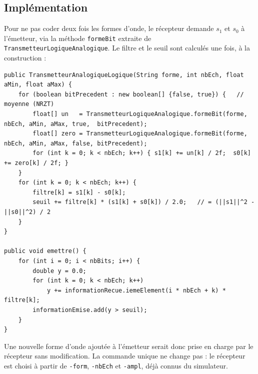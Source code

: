 \documentclass[11pt,a4paper]{article}
\newcommand{\cls}[1]{\texttt{#1}}
\begin{document}
\subsection{Implémentation}
Pour ne pas coder deux fois les formes d'onde, le récepteur demande $s_1$ et $s_0$ à l'émetteur, via la méthode \texttt{formeBit} extraite de \cls{TransmetteurLogiqueAnalogique}. Le filtre et le seuil sont calculés une fois, à la construction :
\begin{lstlisting}
public TransmetteurAnalogiqueLogique(String forme, int nbEch, float aMin, float aMax) {
    for (boolean bitPrecedent : new boolean[] {false, true}) {   // moyenne (NRZT)
        float[] un   = TransmetteurLogiqueAnalogique.formeBit(forme, nbEch, aMin, aMax, true,  bitPrecedent);
        float[] zero = TransmetteurLogiqueAnalogique.formeBit(forme, nbEch, aMin, aMax, false, bitPrecedent);
        for (int k = 0; k < nbEch; k++) { s1[k] += un[k] / 2f;  s0[k] += zero[k] / 2f; }
    }
    for (int k = 0; k < nbEch; k++) {
        filtre[k] = s1[k] - s0[k];
        seuil += filtre[k] * (s1[k] + s0[k]) / 2.0;   // = (||s1||^2 - ||s0||^2) / 2
    }
}

public void emettre() {
    for (int i = 0; i < nbBits; i++) {
        double y = 0.0;
        for (int k = 0; k < nbEch; k++)
            y += informationRecue.iemeElement(i * nbEch + k) * filtre[k];
        informationEmise.add(y > seuil);
    }
}
\end{lstlisting}
Une nouvelle forme d'onde ajoutée à l'émetteur serait donc prise en charge par le récepteur sans modification. La commande unique ne change pas : le récepteur est choisi à partir de \texttt{-form}, \texttt{-nbEch} et \texttt{-ampl}, déjà connus du simulateur.
\end{document}
